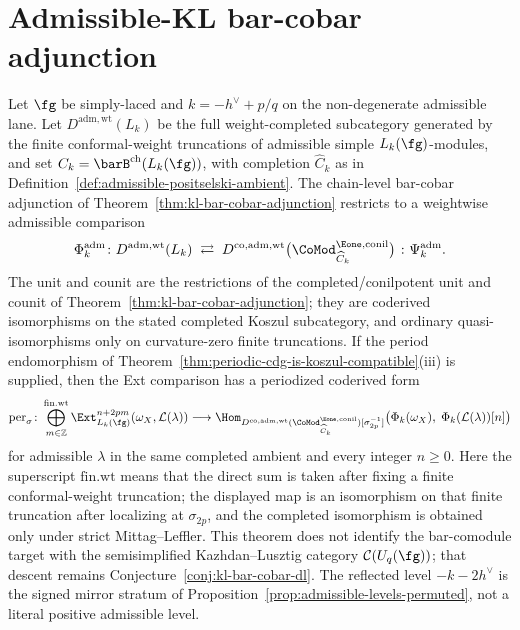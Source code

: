 \section{Admissible-KL bar-cobar adjunction}
\label{sec:admissible-kl-bar-cobar}

\begin{theorem}
\label{thm:admissible-kl-bar-cobar-adjunction}
%
Let $\fg$ be simply-laced and $k = -h^\vee + p/q$ on the
non-degenerate admissible lane.  Let
$D^{\mathrm{adm,wt}}(L_k)$ be the full weight-completed subcategory
generated by the finite conformal-weight truncations of admissible
simple $L_k(\fg)$-modules, and set
$C_k=\barB^{\mathrm{ch}}(L_k(\fg))$, with completion
$\widehat C_k$ as in
Definition~\ref{def:admissible-positselski-ambient}.  The chain-level
bar-cobar adjunction of Theorem~\ref{thm:kl-bar-cobar-adjunction}
restricts to a weightwise admissible comparison
\begin{equation}\label{eq:admissible-kl-adjunction}
\Phi^{\mathrm{adm}}_k\colon
D^{\mathrm{adm,wt}}(L_k)
\;\rightleftarrows\;
D^{\mathrm{co},\mathrm{adm,wt}}
\bigl(\CoMod^{\Eone,\mathrm{conil}}_{\widehat C_k}\bigr)
\;\colon \Psi^{\mathrm{adm}}_k .
\end{equation}
The unit and counit are the restrictions of the completed/conilpotent
unit and counit of Theorem~\ref{thm:kl-bar-cobar-adjunction}; they
are coderived isomorphisms on the stated completed Koszul subcategory,
and ordinary quasi-isomorphisms only on curvature-zero finite
truncations.
If the period endomorphism of
Theorem~\ref{thm:periodic-cdg-is-koszul-compatible}(iii) is supplied,
then the Ext comparison has a periodized coderived form
\begin{equation}\label{eq:admissible-ext-recovery}
\operatorname{per}_{\sigma}\colon
\bigoplus_{m \in \mathbb{Z}}^{\mathrm{fin.wt}}
\Ext^{n+2pm}_{L_k(\fg)}(\omega_X, \mathcal{L}(\lambda))
\longrightarrow
\Hom_{
D^{\mathrm{co},\mathrm{adm,wt}}
(\CoMod^{\Eone,\mathrm{conil}}_{\widehat C_k})[\sigma_{2p}^{-1}]
}
\bigl(\Phi_k(\omega_X),\;
\Phi_k(\mathcal{L}(\lambda))[n]\bigr)
\end{equation}
for admissible $\lambda$ in the same completed ambient and every
integer $n\geq0$.  Here the superscript $\mathrm{fin.wt}$ means that
the direct sum is taken after fixing a finite conformal-weight
truncation; the displayed map is an isomorphism on that finite
truncation after localizing at $\sigma_{2p}$, and the completed
isomorphism is obtained only under strict Mittag--Leffler.  This
theorem does not identify the bar-comodule
target with the semisimplified Kazhdan--Lusztig category
$\mathcal C(U_q(\fg))$; that descent remains
Conjecture~\ref{conj:kl-bar-cobar-dl}.  The reflected level
$-k-2h^\vee$ is the signed mirror stratum of
Proposition~\ref{prop:admissible-levels-permuted}, not a literal
positive admissible level.
\end{theorem}


